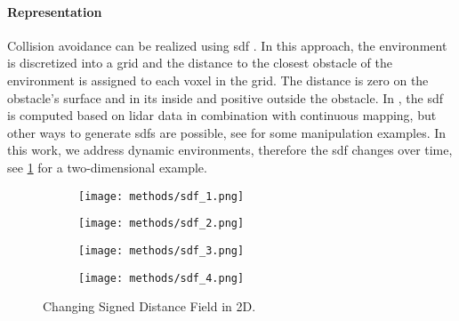 \paragraph{Representation}
Collision avoidance can be realized using \ac{sdf}
\cite{Oleynikova2017voxblox}.
In this approach, the environment is discretized into a grid
and the distance to
the closest obstacle of the environment is assigned to each voxel in the grid.
The distance is zero on the
obstacle's surface and in its inside and positive outside the obstacle.
In \cite{Oleynikova2017voxblox}, the \ac{sdf} is computed
based on lidar data in combination with continuous mapping,
but other ways to generate \acp{sdf} are possible, see
\cite{Liu2022regularized,Koptev2023neural} for some
manipulation examples.
In this work, we address dynamic environments, therefore the \ac{sdf} changes
over time, see \cref{fig:sdf} for a two-dimensional example.
%
\begin{figure}[ht]
  \centering
  \begin{subfigure}{0.25\linewidth}
    \centering
    \texttt{[image: methods/sdf\_1.png]}
  \end{subfigure}%
  \begin{subfigure}{0.25\linewidth}
    \centering
    \texttt{[image: methods/sdf\_2.png]}
  \end{subfigure}%
  \begin{subfigure}{0.25\linewidth}
    \centering
    \texttt{[image: methods/sdf\_3.png]}
  \end{subfigure}%
  \begin{subfigure}{0.25\linewidth}
    \centering
    \texttt{[image: methods/sdf\_4.png]}
  \end{subfigure}
  \caption{Changing Signed Distance Field in 2D.
  }%
  \label{fig:sdf}
\end{figure}

